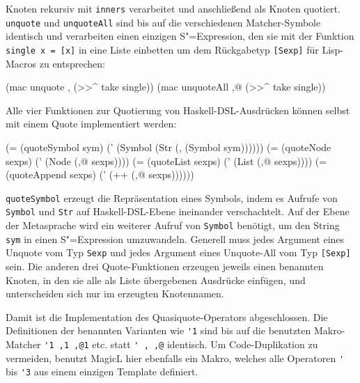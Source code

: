 \documentclass[12pt, a4paper, bibgerm]{scrbook}
\newenvironment{DIFnomarkup}{}{}
\newcommand\icode[1]{\lstinline?#1?}
\newcommand{\sexp}{S"=Expression}
\begin{document}
Knoten rekursiv mit \icode{inners} verarbeitet und anschließend als
Knoten quotiert. \icode{unquote} und \icode{unquoteAll} sind bis auf die
verschiedenen Matcher-Symbole identisch und verarbeiten einen einzigen
\sexp{}, den sie mit der Funktion \icode{single x = [x]} in eine Liste
einbetten um dem Rückgabetyp \icode{[Sexp]} für Lisp-Macros zu
entsprechen:
\begin{DIFnomarkup}\begin{code}
    (mac unquote    ,  (>>^ take single))
    (mac unquoteAll ,@ (>>^ take single))
\end{code}\end{DIFnomarkup}
Alle vier Funktionen zur Quotierung von Haskell-DSL-Ausdrücken
können selbst mit einem Quote implementiert werden:
\begin{DIFnomarkup}\begin{code}
    (= (quoteSymbol sym)
       (' (Symbol (Str (, (Symbol sym))))))
    (= (quoteNode sexps)
       (' (Node (,@ sexps))))
    (= (quoteList sexps)
       (' (List (,@ sexps))))
    (= (quoteAppend sexps)
       (' (++ (,@ sexps))))))
\end{code}\end{DIFnomarkup}
\icode{quoteSymbol} erzeugt die Repräsentation eines Symbols, indem es
Aufrufe von \icode{Symbol} und \icode{Str} auf Haskell-DSL-Ebene
ineinander verschachtelt. Auf der Ebene der Metasprache wird ein
weiterer Aufruf von \icode{Symbol} benötigt, um den String \icode{sym}
in einen \sexp{} umzuwandeln. Generell muss jedes Argument eines Unquote
vom Typ \icode{Sexp} und jedes Argument eines Unquote-All vom Typ
\icode{[Sexp]} sein. Die anderen drei Quote-Funktionen erzeugen jeweils
einen benannten Knoten, in den sie alle als Liste übergebenen Ausdrücke
einfügen, und unterscheiden sich nur im erzeugten Knotennamen.

Damit ist die Implementation des Quasiquote-Operators abgeschlossen. Die
Definitionen der benannten Varianten wie \icode{'1} sind bis auf
die benutzten Makro-Matcher \icode{'1 ,1 ,@1} etc. statt \icode{' , ,@}
identisch. Um Code-Duplikation zu vermeiden, benutzt MagicL hier
ebenfalls ein Makro, welches alle Operatoren \icode{'}
bis \icode{'3} aus einem einzigen Template definiert.
\end{document}
